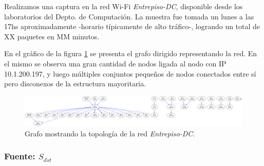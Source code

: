 \documentclass[10pt, a4paper]{article}
\begin{document}
Realizamos una captura en la red Wi-Fi \emph{Entrepiso-DC}, disponible desde los laboratorios del Depto. de Computación. La muestra fue tomada un lunes a las 17hs aproximadamente -horario típicamente de alto tráfico-, logrando un total de XX paquetes en MM minutos.

En el gráfico de la figura \ref{fig:entrepiso-dc-grafo} se presenta el grafo dirigido representando la red. En el mismo se observa una gran cantidad de nodos ligada al nodo con IP 10.1.200.197, y luego múltiples conjuntos pequeños de nodos conectados entre sí pero disconexos de la estructura mayoritaria.

\begin{figure}[H]
  \begin{center}
    \includegraphics[width=0.8\linewidth]{../imgs/entrepiso-dc-ips_red.png}
    \caption{Grafo mostrando la topología de la red \emph{Entrepiso-DC}.}
    \label{fig:entrepiso-dc-grafo}
  \end{center}
\end{figure}

\subsubsection{Fuente: $S_{dst}$}
\end{document}
